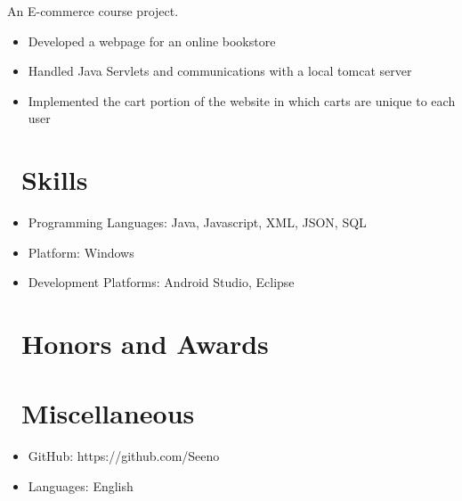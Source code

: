 \documentclass{resume}
\begin{document}

An E-commerce course project.
\begin{itemize}
  \item Developed a webpage for an online bookstore
  \item Handled Java Servlets and communications with a local tomcat server
  \item Implemented the cart portion of the website in which carts are unique to each user
\end{itemize}


\section{\faCogs\ Skills}
\begin{itemize}[parsep=0.5ex]
  \item Programming Languages: Java, Javascript, XML, JSON, SQL
  \item Platform: Windows
  \item Development Platforms: Android Studio, Eclipse
\end{itemize}

\section{\faHeartO\ Honors and Awards}

\section{\faInfo\ Miscellaneous}
\begin{itemize}[parsep=0.5ex]
  \item GitHub: {\color{blue}https://github.com/Seeno}
  \item Languages: English
\end{itemize}

%
%
\end{document}
